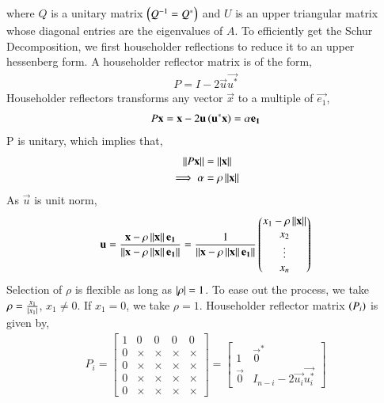 \documentclass[journal]{IEEEtran}
\numberwithin{equation}{enumi}
\numberwithin{figure}{enumi}
\begin{document}
where $Q$ is a unitary matrix $\left(Q^{-1} = Q^{\ast}\right)$ and $U$ is an upper triangular matrix whose diagonal entries are the eigenvalues of $A$.
\newline
To efficiently get the Schur Decomposition, we first householder reflections to reduce it to an upper hessenberg form.
\newline
A householder reflector matrix is of the form,
\begin{align}
	P = I - 2\vec{u}\vec{u^{\ast}}
\end{align}
Householder reflectors transforms any vector $\vec{x}$ to a multiple of $\vec{e_1}$,
\begin{align}
	P\mathbf{x} = \mathbf{x} - 2\mathbf{u}\left(\mathbf{u^{\ast}}\mathbf{x}\right) = \alpha \mathbf{e_1}
\end{align}
P is unitary, which implies that,
\begin{align}
	\left\lVert P\mathbf{x}\right\rVert &= \left\lVert\mathbf{x}\right\rVert\\
	\implies \alpha &= \rho\left\lVert\mathbf{x}\right\rVert\\
\end{align}
As $\vec{u}$ is unit norm,
\begin{align}
	\mathbf{u} = \frac{\mathbf{x} - \rho\left\lVert\mathbf{x}\right\rVert\mathbf{e_1}}{\left\lVert\mathbf{x} - \rho\left\lVert\mathbf{x}\right\rVert\mathbf{e_1}\right\rVert} = \frac{1}{\left\lVert\mathbf{x} - \rho\left\lVert\mathbf{x}\right\rVert\mathbf{e_1}\right\rVert} \begin{pmatrix} x_1 - \rho\left\lVert\mathbf{x}\right\rVert\\x_2\\\vdots\\x_n\end{pmatrix}
\end{align}
Selection of $\rho$ is flexible as long as $\left\vert\rho\right\vert = 1$. To ease out the process, we take $\rho = \frac{x_1}{\left\vert x_1\right\vert}$, $x_1 \neq 0$. If $x_1 = 0$, we take $\rho = 1$.
\newline
Householder reflector matrix $\left(P_{i}\right)$ is given by,
\begin{align}
	P_{i} = 
	\begin{bmatrix}
		1 & 0 & 0 & 0 & 0\\    
		0 & \times & \times & \times & \times\\
		0 & \times & \times & \times & \times\\
		0 & \times & \times & \times & \times\\
		0 & \times & \times & \times & \times
	\end{bmatrix} = \begin{bmatrix}
		1 & \vec{0}^{\ast}\\    
		\vec{0} & I_{n - i} - 2\vec{u_{i}}\vec{u_{i}^{\ast}}
	\end{bmatrix}
\end{align}
\end{document}
